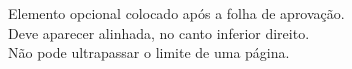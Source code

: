 \begin{dedicatoria}
	\vspace*{\fill}
    
    \center
    \begin{flushright}
Elemento opcional colocado após a folha de aprovação.\\
Deve aparecer alinhada, no canto inferior direito.\\
Não pode ultrapassar o limite de uma página.
    \end{flushright}
    
\end{dedicatoria}